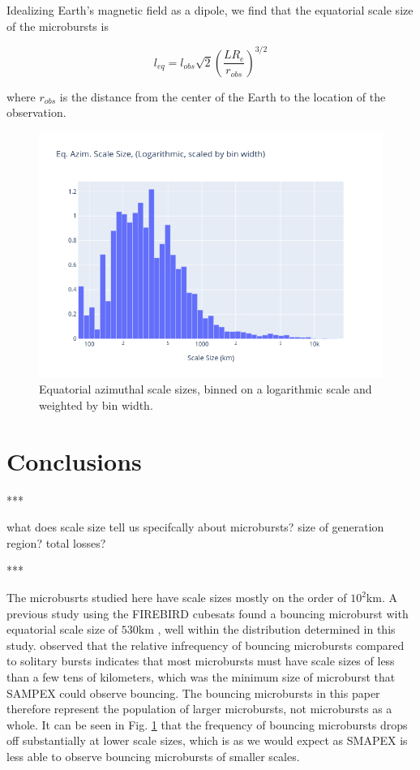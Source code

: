\documentclass[draft]{agujournal2019}
\begin{document}
Idealizing Earth's magnetic field as a dipole, we find that the equatorial scale size of the microbursts is 

\begin{equation}
l_{eq} = l_{obs} \sqrt{2} \left( \frac{L R_e}{r_{obs} } \right)^{3/2}
\end{equation}

where $r_{obs}$ is the distance from the center of the Earth to the location of the observation.

\begin{figure}[h!]
 \includegraphics[width=\textwidth]{log_eq_scales.png}
 \caption{Equatorial azimuthal scale sizes, binned on a logarithmic scale and weighted by bin width.}
 \label{fig:log_eq_scales}
\end{figure}

\section{Conclusions}
***

what does scale size tell us specifcally about microbursts? size of generation region? total losses?

***

The microbusrts studied here have scale sizes mostly on the order of $10^2$km.
A previous study using the FIREBIRD cubesats  found a bouncing microburst with equatorial scale size of $530$km \cite{fire_bounce}, well within the distribution determined in this study.
\cite{Blake96} observed that the relative infrequency of bouncing microbursts compared to solitary bursts indicates that most microbursts must have scale sizes of less than a few tens of kilometers, which was the minimum size of microburst that SAMPEX could observe bouncing. 
The bouncing microbursts in this paper therefore represent the population of larger microbursts, not microbursts as a whole.
It can be seen in Fig. \ref{fig:log_eq_scales} that the frequency of bouncing microbursts drops off substantially at lower scale sizes, which is as we would expect as SMAPEX is less able to observe bouncing microbursts of smaller scales. 
\end{document}
